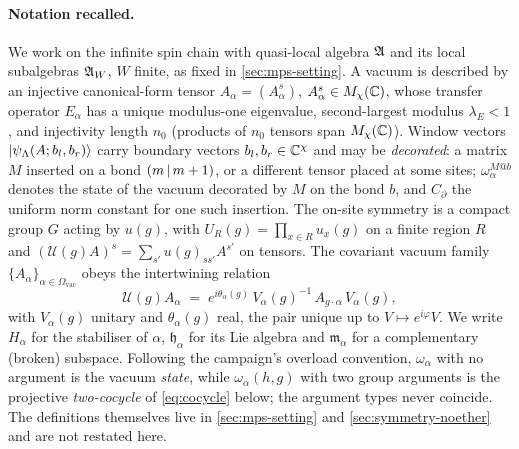 \paragraph*{Notation recalled.}
We work on the infinite spin chain with quasi-local algebra $\mathfrak{A}$ and its local
subalgebras $\mathfrak{A}_W$, $W$ finite, as fixed in \cref{sec:mps-setting}.  A vacuum
is described by an injective canonical-form tensor $A_\alpha=(A_\alpha^s)$,
$A_\alpha^s\in M_\chi(\mathbb{C})$, whose transfer operator $E_\alpha$ has a unique
modulus-one eigenvalue, second-largest modulus $\lambda_E<1$, and injectivity
length $n_0$ (products of $n_0$ tensors span $M_\chi(\mathbb{C})$).  Window vectors
$|\psi_\Lambda(A;b_l,b_r)\rangle$ carry boundary vectors $b_l,b_r\in\mathbb{C}^\chi$ and
may be \emph{decorated}: a matrix $M$ inserted on a bond $(m\,|\,m+1)$, or a
different tensor placed at some sites; $\omega_\alpha^{M@b}$ denotes the state of
the vacuum decorated by $M$ on the bond $b$, and $C_\partial$ the uniform norm
constant for one such insertion.  The on-site symmetry is a compact group $G$
acting by $u(g)$, with $U_R(g)=\prod_{x\in R}u_x(g)$ on a finite region $R$ and
$(\mathcal{U}(g)A)^s=\sum_{s'}u(g)_{ss'}A^{s'}$ on tensors.  The covariant vacuum
family $\{A_\alpha\}_{\alpha\in\Omega_{\mathrm{vac}}}$ obeys the intertwining
relation
\begin{equation}
  \mathcal{U}(g)A_\alpha \;=\; e^{i\theta_\alpha(g)}\,V_\alpha(g)^{-1}\,
  A_{g\cdot\alpha}\,V_\alpha(g),
  \label{eq:IT}
\end{equation}
with $V_\alpha(g)$ unitary and $\theta_\alpha(g)$ real, the pair unique up to
$V\mapsto e^{i\varphi}V$.  We write $H_\alpha$ for the stabiliser of $\alpha$,
$\mathfrak{h}_\alpha$ for its Lie algebra and $\mathfrak{m}_\alpha$ for a
complementary (broken) subspace.  Following the campaign's overload convention,
$\omega_\alpha$ with no argument is the vacuum \emph{state}, while
$\omega_\alpha(h,g)$ with two group arguments is the projective
\emph{two-cocycle} of \cref{eq:cocycle} below; the argument types never coincide.
The definitions themselves live in \cref{sec:mps-setting} and
\cref{sec:symmetry-noether} and are not restated here.

